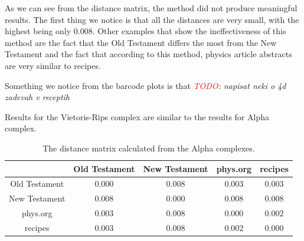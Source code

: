 \documentclass[12pt,a4paper]{amsart}
\begin{document}
As we can see from the distance matrix, the method did not produce meaningful
results. The first thing we notice is that all the distances are very small,
with the highest being only $0.008$. Other examples that show the
ineffectiveness of this method are the fact that the Old Testament differs the
most from the New Testament and the fact that according to this method, physics
article abstracts are very similar to recipes.

Something we notice from the barcode plots is that
\emph{\textcolor{red}{TODO}: napisat neki o 4d zadevah v receptih}

Results for the Vietoris-Rips complex are similar to the results for Alpha
complex.

\begin{table}
  \centering
  \begin{tabular}{c|cccc}
                  & Old Testament & New Testament & phys.org & recipes \\ \hline
    Old Testament & $0.000$ & $0.008$ & $0.003$ & $0.003$ \\
    New Testament & $0.008$ & $0.000$ & $0.008$ & $0.008$ \\
    phys.org      & $0.003$ & $0.008$ & $0.000$ & $0.002$ \\
    recipes       & $0.003$ & $0.008$ & $0.002$ & $0.000$ \\
  \end{tabular}

  \caption{The distance matrix calculated from the Alpha complexes.}
  \label{tab:alpha}
\end{table}
\end{document}
